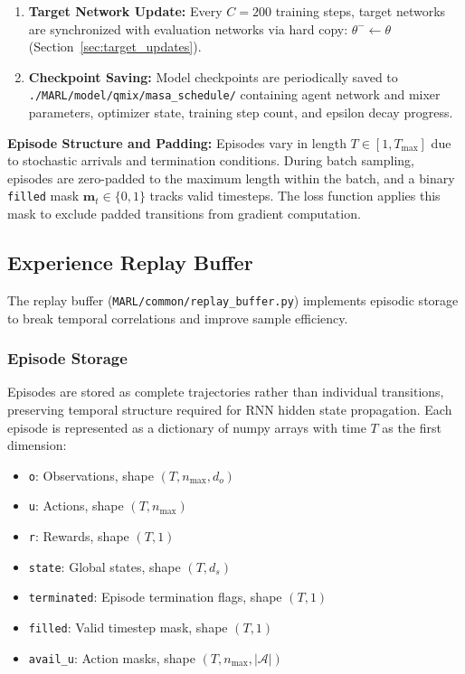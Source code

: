 \begin{enumerate}
\item \textbf{Target Network Update:} Every \(C = 200\) training steps, target networks are synchronized with evaluation networks via hard copy: \(\theta^- \leftarrow \theta\) (Section~\ref{sec:target_updates}).

\item \textbf{Checkpoint Saving:} Model checkpoints are periodically saved to \texttt{./MARL/model/qmix/masa\_schedule/} containing agent network and mixer parameters, optimizer state, training step count, and epsilon decay progress.
\end{enumerate}

\textbf{Episode Structure and Padding:} Episodes vary in length \(T \in [1, T_{\max}]\) due to stochastic arrivals and termination conditions. During batch sampling, episodes are zero-padded to the maximum length within the batch, and a binary \texttt{filled} mask \(\mathbf{m}_t \in \{0,1\}\) tracks valid timesteps. The loss function applies this mask to exclude padded transitions from gradient computation.

\subsection{Experience Replay Buffer}
\label{sec:replay_buffer}

The replay buffer (\texttt{MARL/common/replay\_buffer.py}) implements episodic storage to break temporal correlations and improve sample efficiency.

\subsubsection{Episode Storage}

Episodes are stored as complete trajectories rather than individual transitions, preserving temporal structure required for RNN hidden state propagation. Each episode is represented as a dictionary of numpy arrays with time \(T\) as the first dimension:

\begin{itemize}
\item \texttt{o}: Observations, shape \((T, n_{\max}, d_o)\)
\item \texttt{u}: Actions, shape \((T, n_{\max})\)
\item \texttt{r}: Rewards, shape \((T, 1)\)
\item \texttt{state}: Global states, shape \((T, d_s)\)
\item \texttt{terminated}: Episode termination flags, shape \((T, 1)\)
\item \texttt{filled}: Valid timestep mask, shape \((T, 1)\)
\item \texttt{avail\_u}: Action masks, shape \((T, n_{\max}, |\mathcal{A}|)\)
\end{itemize}

